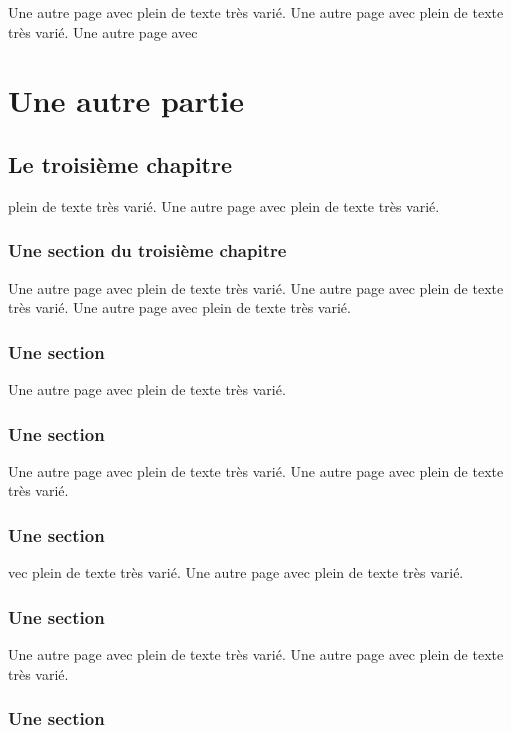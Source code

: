 \documentclass[11pt]{thesul}
\begin{document}
Une autre page avec plein de texte très varié.
Une autre page avec plein de texte très varié.
Une autre page avec


\NumberThisInToc
\part{Une autre partie}

\FrameThisInToc
\chapter{Le troisième chapitre}
\minitoc
plein de texte très varié.
Une autre page avec plein de texte très varié.

\section{Une section du troisième chapitre}

Une autre page avec plein de texte très varié.
Une autre page avec plein de texte très varié.
Une autre page avec plein de texte très varié.

\PutLineInToc

\section{Une section}

Une autre page avec plein de texte très varié.

\section{Une section}

Une autre page avec plein de texte très varié.
Une autre page avec plein de texte très varié.


\section{Une section}

vec plein de texte très varié.
Une autre page avec plein de texte très varié.

\section{Une section}

Une autre page avec plein de texte très varié.
Une autre page avec plein de texte très varié.

\section{Une section}
\end{document}
